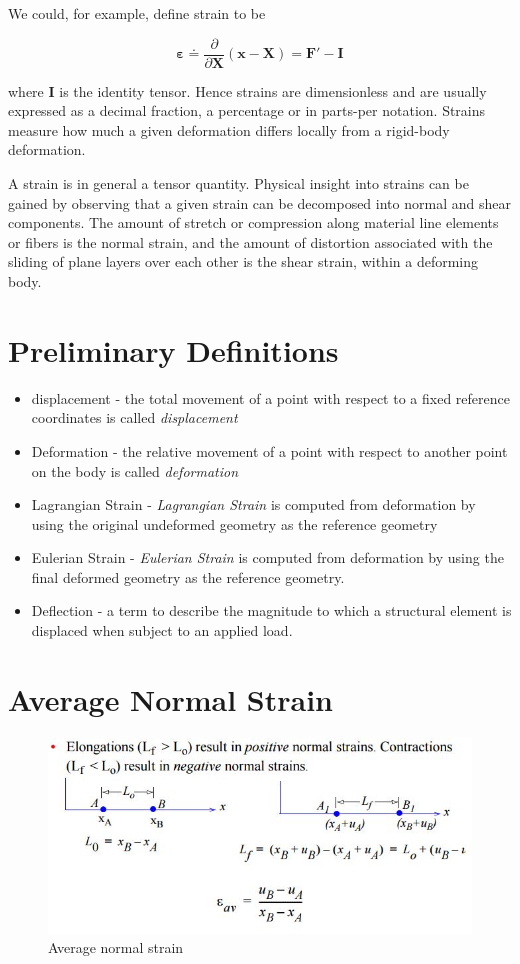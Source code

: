 We could, for example, define strain to be

\begin{equation}
\mathbf{\varepsilon} \doteq \frac{\partial}{\partial \mathbf{X}} \left( \mathbf{x} - \mathbf{X} \right) = \mathbf{F}' - \mathbf{I}
\end{equation}

where $ \mathbf{I} $ is the identity tensor. Hence strains are dimensionless and are usually expressed as a decimal fraction, a percentage or in parts-per notation. Strains measure how much a given deformation differs locally from a rigid-body deformation.

A strain is in general a tensor quantity. Physical insight into strains can be gained by observing that a given strain can be decomposed into normal and shear components. The amount of stretch or compression along material line elements or fibers is the normal strain, and the amount of distortion associated with the sliding of plane layers over each other is the shear strain, within a deforming body.

\section{Preliminary Definitions}
\begin{itemize}
	\item displacement - the total movement of a point with respect to a fixed reference coordinates is called \textit{displacement}
	\item Deformation - the relative movement of a point with respect to another point on the body is called \textit{deformation}
	\item Lagrangian Strain - \textit{Lagrangian Strain} is computed from deformation by using the original undeformed geometry as the reference geometry
	\item Eulerian Strain - \textit{Eulerian Strain} is computed from deformation by using the final deformed geometry as the reference geometry.
	\item Deflection - a term to describe the magnitude to which a structural element is displaced when subject to an applied load.
\end{itemize}

\section{Average Normal Strain}
\begin{figure}[h]
\centering
\includegraphics[width=0.7\linewidth]{figures/average_normal_strain}
\caption{Average normal strain}
\label{fig:strain_def}
\end{figure}

